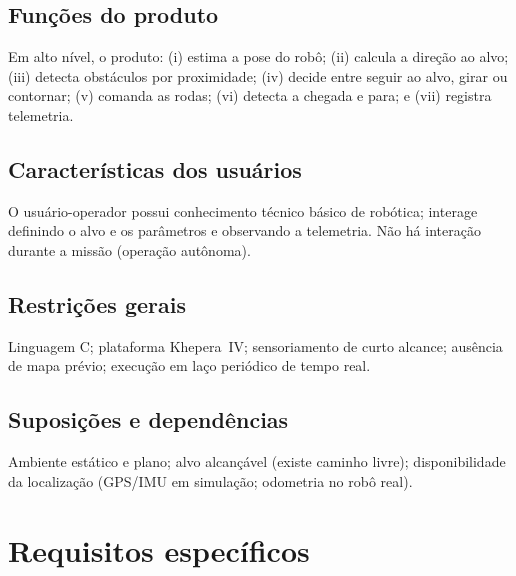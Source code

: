 \subsection{Funções do produto}
Em alto nível, o produto: (i) estima a pose do robô; (ii) calcula a direção ao alvo; (iii) detecta obstáculos por proximidade; (iv) decide entre seguir ao alvo, girar ou contornar; (v) comanda as rodas; (vi) detecta a chegada e para; e (vii) registra telemetria.

\subsection{Características dos usuários}
O usuário-operador possui conhecimento técnico básico de robótica; interage definindo o alvo e os parâmetros e observando a telemetria. Não há interação durante a missão (operação autônoma).

\subsection{Restrições gerais}
Linguagem C; plataforma Khepera~IV; sensoriamento de curto alcance; ausência de mapa prévio; execução em laço periódico de tempo real.

\subsection{Suposições e dependências}
Ambiente estático e plano; alvo alcançável (existe caminho livre); disponibilidade da localização (GPS/IMU em simulação; odometria no robô real).

\section{Requisitos específicos}\label{sec:esp}
